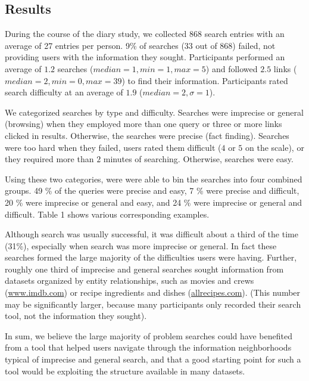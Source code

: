 \subsection{Results}

During the course of the diary study, we collected $868$ search entries with an average of 27 entries per person. 9\% of searches (33 out of 868) failed, not providing users with the information they sought. Participants performed an average of $1.2$ searches ($median=1, min =1, max=5$) and followed $2.5$ links ($median=2, min=0, max=39$) to find their information. Participants rated search difficulty at an average of $1.9$ ($median=2,  \sigma=1$). 

We categorized searches by type and difficulty. Searches were imprecise or general (browsing) when they employed more than one query or three or more links clicked in results. Otherwise, the searches were precise (fact finding). Searches were too hard when they failed, users rated them difficult ($4$ or $5$ on the scale), or they required more than $2$ minutes of searching. Otherwise, searches were easy. 

Using these two categories, were were able to bin the searches into four combined groups. 49 \% of the queries were precise and easy, 7 \% were precise and difficult, 20 \% were imprecise or general and easy, and 24 \% were imprecise or general and difficult. Table 1 shows various corresponding examples.

Although search was usually successful, it was difficult about a third of the time (31\%), especially when search was more imprecise or general. In fact these searches formed the large majority of the difficulties users were having. Further, roughly one third of imprecise and general searches sought information from datasets organized by entity relationships, such as movies and crews (\url{www.imdb.com}) or recipe ingredients and dishes (\url{allrecipes.com}). (This number may be significantly larger, because many participants only recorded their search tool, not the information they sought).

In sum, we believe the large majority of problem searches could have benefited from a tool that helped users navigate through the information neighborhoods typical of imprecise and general search, and that a good starting point for such a tool would be exploiting the structure available in many datasets. 

